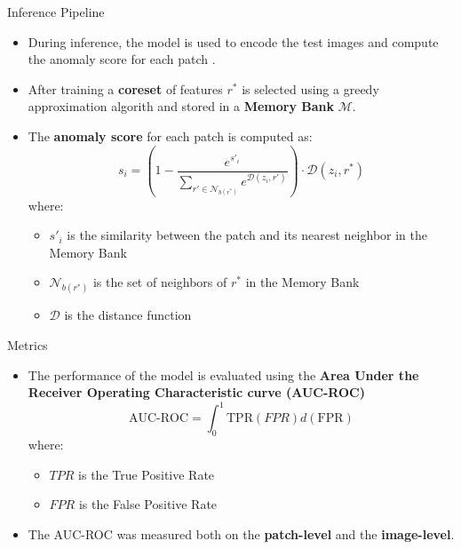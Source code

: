 \documentclass{beamer}
\begin{document}
\begin{frame}{Inference Pipeline}
      \begin{itemize}
              \item During inference, the model is used to encode the test images
               and compute the anomaly score for each patch \cite{patchcore}.
              \item  After training a \textbf{coreset} of features $r^*$ is selected
              using a greedy approximation algorith and stored in 
              a \textbf{Memory Bank} $\mathcal{M}$.
                  \item The \textbf{anomaly score} for each patch is computed as:
                  \begin{equation}
                      s_i = (1- \frac{e^{s'_i}}{\sum_{r' \in \mathcal{N}_{b(r^*)}}e^{\mathcal{D}(z_i, r')}}) \cdot \mathcal{D}(z_i, r^*)
                  \end{equation}
                  where:
                  \begin{itemize}
                      \item $s'_i$ is the similarity between the patch and its nearest neighbor in the Memory Bank
                      \item $\mathcal{N}_{b(r^*)}$ is the set of neighbors of $r^*$ in the Memory Bank
                      \item $\mathcal{D}$ is the distance function
                      \end{itemize}
              \end{itemize}
\end{frame}
\begin{frame}{Metrics}
      \begin{itemize}
              \item The performance of the model is evaluated using the \textbf{Area Under the
               Receiver Operating Characteristic curve (AUC-ROC)} 
               \begin{equation}
                   \text{AUC-ROC} =  \int_{0}^{1} \text{TPR}(FPR)  d(\text{FPR})
                  \end{equation}
                  where:
                  \begin{itemize}
                      \item $TPR$ is the True Positive Rate
                      \item $FPR$ is the False Positive Rate
                      \end{itemize}
                  
                  \item The AUC-ROC was measured both on the \textbf{patch-level} and 
                  the \textbf{image-level}.
              \end{itemize}
\end{frame}
\end{document}
